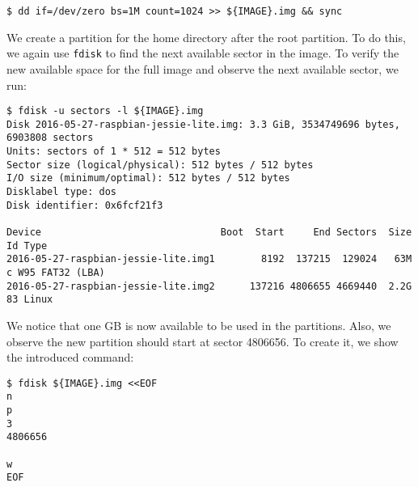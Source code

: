\begin{lstlisting}[]
$ dd if=/dev/zero bs=1M count=1024 >> ${IMAGE}.img && sync
\end{lstlisting}
\FloatBarrier
\vspace{-5mm}

We create a partition for the home directory after the root partition.
To do this, we again use \texttt{fdisk} to find the next available sector
in the image. To verify the new available space for the full image and observe
the next available sector, we run:
\begin{lstlisting}[]
$ fdisk -u sectors -l ${IMAGE}.img
Disk 2016-05-27-raspbian-jessie-lite.img: 3.3 GiB, 3534749696 bytes, 6903808 sectors
Units: sectors of 1 * 512 = 512 bytes
Sector size (logical/physical): 512 bytes / 512 bytes
I/O size (minimum/optimal): 512 bytes / 512 bytes
Disklabel type: dos
Disk identifier: 0x6fcf21f3

Device                               Boot  Start     End Sectors  Size Id Type
2016-05-27-raspbian-jessie-lite.img1        8192  137215  129024   63M  c W95 FAT32 (LBA)
2016-05-27-raspbian-jessie-lite.img2      137216 4806655 4669440  2.2G 83 Linux
\end{lstlisting}
\FloatBarrier
\vspace{-5mm}

We notice that one GB is now available to be used in the partitions. Also, we
observe the new partition should start at sector 4806656. To create it, we
show the introduced command:%

%
%
%
\begin{lstlisting}[]
$ fdisk ${IMAGE}.img <<EOF
n
p
3
4806656

w
EOF
\end{lstlisting}
\FloatBarrier
\vspace{-5mm}


